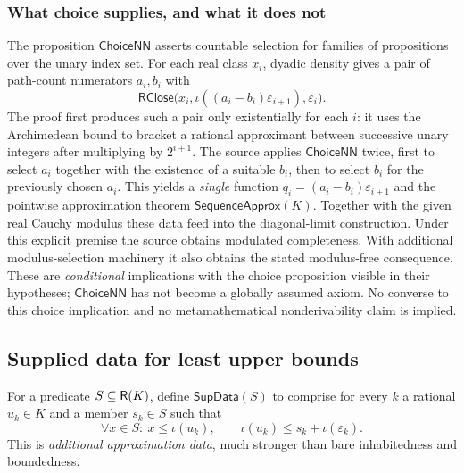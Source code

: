 \documentclass[11pt,reqno]{amsart}
\theoremstyle{definition}\newtheorem{definition}[theorem]{Definition}
\theoremstyle{remark}\newtheorem{remark}[theorem]{Remark}
\newcommand{\eps}{\varepsilon}
\begin{document}
\medskip
\subsubsection*{What choice supplies, and what it does not}\label{supp:13-5}
The proposition $\mathsf{ChoiceNN}$ asserts countable selection for families of propositions over the unary index set. For each real class $x_i$, dyadic density gives a pair of path-count numerators $a_i,b_i$ with
\[
\mathsf{RClose}\bigl(x_i,\iota((a_i-b_i)\eps_{i+1}),\eps_i\bigr).
\]
The proof first produces such a pair only existentially for each $i$: it uses the Archimedean bound to bracket a rational approximant between successive unary integers after multiplying by $2^{i+1}$. The source applies $\mathsf{ChoiceNN}$ twice, first to select $a_i$ together with the existence of a suitable $b_i$, then to select $b_i$ for the previously chosen $a_i$. This yields a \emph{single} function $q_i=(a_i-b_i)\eps_{i+1}$ and the pointwise approximation theorem $\mathsf{SequenceApprox}(K)$. Together with the given real Cauchy modulus these data feed into the diagonal-limit construction. Under this explicit premise the source obtains modulated completeness. With additional modulus-selection machinery it also obtains the stated modulus-free consequence. These are \emph{conditional} implications with the choice proposition visible in their hypotheses; $\mathsf{ChoiceNN}$ has not become a globally assumed axiom. No converse to this choice implication and no metamathematical nonderivability claim is implied.
\medskip

\subsection{Supplied data for least upper bounds}\label{main:sub-50}\label{subsec:supdata}
For a predicate $S\subseteq\mathsf R(K)$, define $\mathsf{SupData}(S)$ to comprise for every $k$ a rational $u_k\in K$ and a member $s_k\in S$ such that
\begin{equation}\label{eq:supdata}
\forall x\in S:\ x\le\iota(u_k),\qquad
\iota(u_k)\le s_k+\iota(\eps_k).
\end{equation}
This is \emph{additional approximation data}, much stronger than bare inhabitedness and boundedness.
\end{document}
